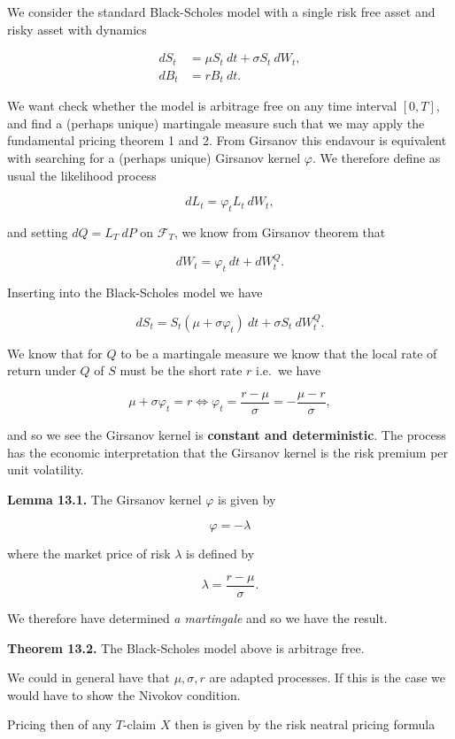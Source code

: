 \documentclass[
]{article}
\begin{document}
We consider the standard Black-Scholes model with a single risk free
asset and risky asset with dynamics

\begin{align*}
dS_t &= \mu S_t\ dt+\sigma S_t\ dW_t,\\
dB_t &= r B_t\ dt.
\end{align*}

We want check whether the model is arbitrage free on any time interval
\([0,T]\), and find a (perhaps unique) martingale measure such that we
may apply the fundamental pricing theorem 1 and 2. From Girsanov this
endavour is equivalent with searching for a (perhaps unique) Girsanov
kernel \(\varphi\). We therefore define as usual the likelihood process

\[
dL_t=\varphi_ tL_t\ dW_t,
\]

and setting \(dQ=L_T\ dP\) on \(\mathcal{F}_T\), we know from Girsanov
theorem that

\[
dW_t=\varphi_t\ dt+dW_t^Q.
\]

Inserting into the Black-Scholes model we have

\[
dS_t=S_t(\mu + \sigma \varphi_t)\ dt+\sigma S_t\ dW_t^Q.
\]

We know that for \(Q\) to be a martingale measure we know that the local
rate of return under \(Q\) of \(S\) must be the short rate \(r\) i.e.~we
have

\[
\mu + \sigma \varphi_t=r\iff \varphi_t=\frac{r-\mu}{\sigma}=-\frac{\mu -r}{\sigma},
\]

and so we see the Girsanov kernel is \textbf{constant and
deterministic}. The process has the economic interpretation that the
Girsanov kernel is the risk premium per unit volatility.

\textbf{Lemma 13.1.} The Girsanov kernel \(\varphi\) is given by

\[
\varphi = -\lambda
\]

where the market price of risk \(\lambda\) is defined by

\[
\lambda =\frac{r-\mu}{\sigma}.
\]

We therefore have determined \emph{a martingale} and so we have the
result.

\textbf{Theorem 13.2.} The Black-Scholes model above is arbitrage free.

We could in general have that \(\mu,\sigma,r\) are adapted processes. If
this is the case we would have to show the Nivokov condition.

Pricing then of any \(T\)-claim \(X\) then is given by the risk neatral
pricing formula
\end{document}
